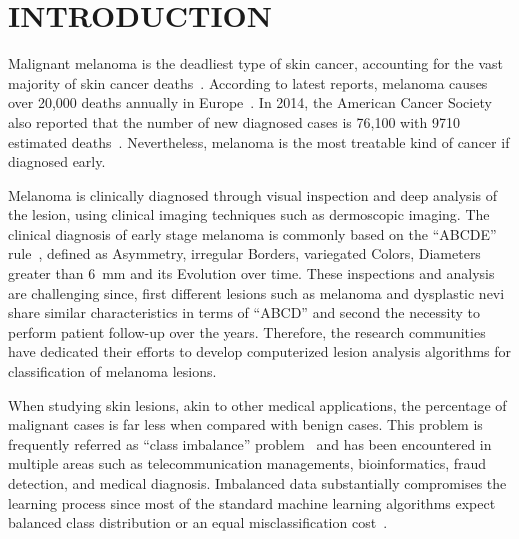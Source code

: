 \graphicspath{ {./content/intro/figures/} }

\section{\uppercase{Introduction}}
\label{sec:intro}  %

\noindent Malignant melanoma is the deadliest type of skin cancer, accounting for the vast majority of skin cancer deaths~\cite{CancerFactsFigures2014}. 
According to latest reports, melanoma causes over 20,000 deaths annually in Europe~\cite{forsea2012melanoma}. 
In 2014, the American Cancer Society also reported that the number of new diagnosed cases is 76,100 with 9710 estimated deaths~\cite{CancerFactsFigures2014}. 
Nevertheless, melanoma is the most treatable kind of cancer if diagnosed early. 

Melanoma is clinically diagnosed through visual inspection and deep analysis of the lesion, using clinical imaging techniques such as dermoscopic imaging.
The clinical diagnosis of early stage melanoma is commonly based on the ``ABCDE'' rule~\cite{abbasi2004early}, defined as Asymmetry, irregular Borders, variegated Colors, Diameters greater than \SI{6}{\milli \metre} and its Evolution over time. %
These inspections and analysis are challenging since, first different lesions such as melanoma and dysplastic nevi share similar characteristics in terms of ``ABCD'' and second the necessity to perform patient follow-up over the years.
Therefore, the research communities have dedicated their efforts to develop computerized lesion analysis algorithms for classification of melanoma lesions. 

When studying skin lesions, akin to other medical applications, the percentage of malignant cases is far less when compared with benign cases. 
This problem is frequently referred as ``class imbalance'' problem~\cite{prati2009data} and has been encountered in multiple areas such as telecommunication managements, bioinformatics, fraud detection, and medical diagnosis. 
Imbalanced data substantially compromises the learning process since most of the standard machine learning algorithms expect balanced class distribution or an equal misclassification cost~\cite{he2009learning}.

